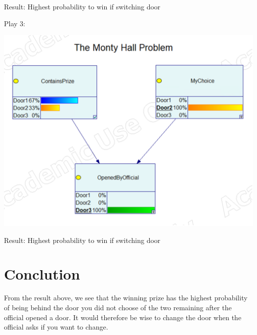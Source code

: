 \documentclass{article}
\begin{document}
Result: Highest probability to win if switching door

Play 3:

\includegraphics[width=\linewidth]{play3.png}

Result: Highest probability to win if switching door

\section*{Conclution}

From the result above, we see that the winning prize has the highest probability of being behind the door you did not choose of the two remaining after the official opened a door. It would therefore be wise to change the door when the official asks if you want to change.
\end{document}
